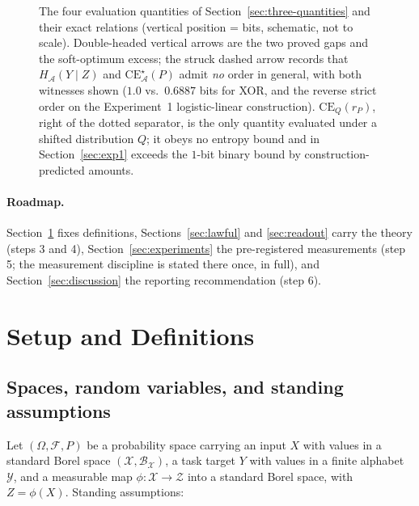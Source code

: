 \documentclass[twocolumn,10pt]{article}
\theoremstyle{definition}
\theoremstyle{remark}
\newcommand{\cA}{\mathcal{A}}
\newcommand{\cX}{\mathcal{X}}
\newcommand{\cY}{\mathcal{Y}}
\newcommand{\cZ}{\mathcal{Z}}
\newcommand{\CE}{\mathrm{CE}}
\newcommand{\CEQ}[1]{\CE_{Q}({#1})}
\newcommand{\rP}{r_{P}}
\begin{document}
\begin{figure}[t]
\caption{The four evaluation quantities of
Section~\ref{sec:three-quantities} and their exact relations (vertical
position = bits, schematic, not to scale). Double-headed vertical arrows
are the two proved gaps and the soft-optimum excess; the struck dashed
arrow records that $H_{\cA}(Y \mid Z)$ and $\CE^{\star}_{\cA}(P)$ admit
\emph{no} order in general, with both witnesses shown ($1.0$ vs.\
$0.6887$ bits for XOR, and the reverse strict order on the Experiment~1
logistic-linear construction). $\CEQ{\rP}$, right of the dotted
separator, is the only quantity evaluated under a shifted distribution
$Q$; it obeys no entropy bound and in Section~\ref{sec:exp1} exceeds
the $1$-bit binary bound by construction-predicted amounts.}
\label{fig:quantities}
\end{figure}


\paragraph{Roadmap.} Section~\ref{sec:setup} fixes definitions,
Sections~\ref{sec:lawful} and \ref{sec:readout} carry the theory
(steps 3 and 4), Section~\ref{sec:experiments} the pre-registered
measurements (step 5; the measurement discipline is stated there
once, in full), and Section~\ref{sec:discussion} the reporting
recommendation (step 6).

\section{Setup and Definitions}
\label{sec:setup}

\subsection{Spaces, random variables, and standing assumptions}

Let $(\Omega, \mathcal F, P)$ be a probability space carrying an input $X$
with values in a standard Borel space $(\cX, \mathcal B_{\cX})$, a task
target $Y$ with values in a finite alphabet $\cY$, and a measurable map
$\phi : \cX \to \cZ$ into a standard Borel space, with
$Z = \phi(X)$. Standing assumptions:
\end{document}
